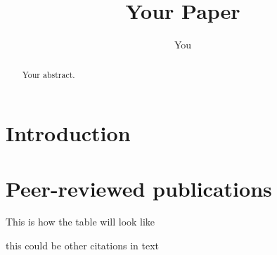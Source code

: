 \documentclass{article}
\title{Your Paper}
\author{You}
\begin{document}
\maketitle

\begin{abstract}
Your abstract.
\end{abstract}

\section{Introduction}


\section{Peer-reviewed publications}

This is how the table will look like



this could be other citations in text

\cite{zak_et_al_1993}

\cite{ziska_et_al_2004} 


{}
\end{document}
